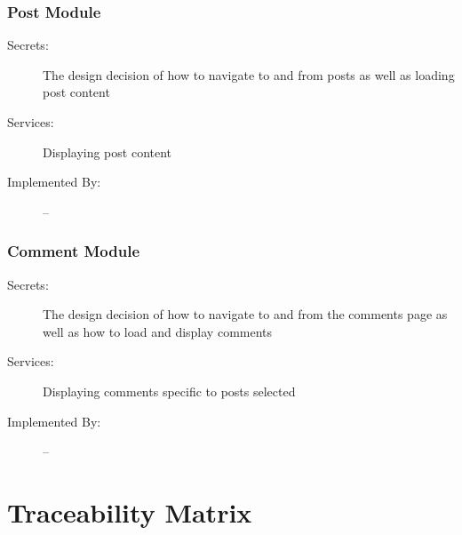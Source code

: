 \documentclass[12pt,fleqn]{article}
\begin{document}
\subsubsection{Post Module}
\begin{description}
\item[Secrets:] The design decision of how to navigate to and from posts as well as loading post content
\item[Services:] Displaying post content
\item[Implemented By:] --
\end{description}

\subsubsection{Comment Module}
\begin{description}
\item[Secrets:] The design decision of how to navigate to and from the comments page as well as how to load and display comments
\item[Services:] Displaying comments specific to posts selected
\item[Implemented By:] --
\end{description}

\section{Traceability Matrix} \label{sec:tracematrix}
\end{document}
